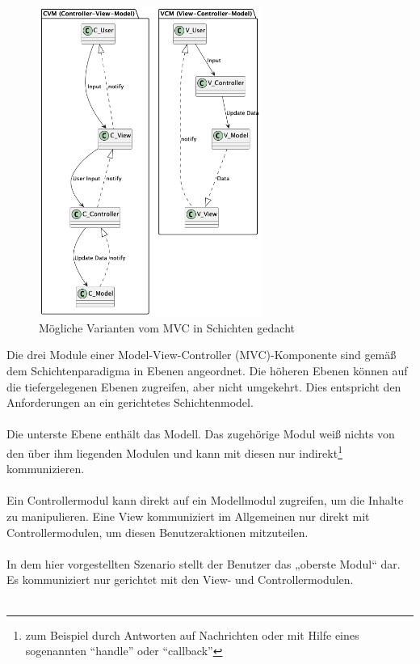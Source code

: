 \documentclass[../vs-script-first-v01.tex]{subfiles}
\begin{document}
\begin{figure}[ht]
  \centering
  \includegraphics[width=0.65\textwidth]{fig/uml/mvc-varianten.png}
  \caption{Mögliche Varianten vom MVC in Schichten gedacht}
  \label{fig:mvs-varianten}
\end{figure}
Die drei Module einer Model-View-Controller (MVC)-Komponente sind gemäß dem Schichtenparadigma in Ebenen angeordnet. Die höheren Ebenen können auf die tiefergelegenen Ebenen zugreifen, aber nicht umgekehrt. Dies entspricht den Anforderungen an ein gerichtetes Schichtenmodel. 
\\\\
Die unterste Ebene enthält das Modell. Das zugehörige Modul weiß nichts von den über ihm liegenden Modulen und kann mit diesen nur indirekt\footnote{zum Beispiel durch Antworten auf Nachrichten oder mit Hilfe eines sogenannten \enquote{handle} oder \enquote{callback}} kommunizieren.
\\\\
Ein Controllermodul kann direkt auf ein Modellmodul zugreifen, um die Inhalte zu manipulieren. Eine View kommuniziert im Allgemeinen nur direkt mit Controllermodulen, um diesen Benutzeraktionen mitzuteilen.
\\\\
In dem hier vorgestellten Szenario stellt der Benutzer das „oberste Modul“ dar. Es kommuniziert nur gerichtet mit den View- und Controllermodulen. 
\\\\
\end{document}
